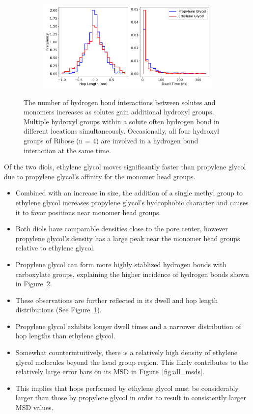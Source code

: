 \documentclass{article}
\begin{document}
\begin{figure}[!htb]
\begin{subfigure}{\textwidth}
  \includegraphics[width=0.9\linewidth]{dwell_hop_PG_GCL.pdf}
  \caption{}\label{fig:dwell_hop_PG_GCL}
  \end{subfigure}
  \caption{The number of hydrogen bond interactions between solutes and monomers increases
  as solutes gain additional hydroxyl groups. Multiple hydroxyl groups within a solute often
  hydrogen bond in different locations simultaneously. Occasionally, all four hydroxyl groups
  of Ribose (n = 4) are involved in a hydrogen bond interaction at the same time.}\label{fig:multi_hbonds}
  \end{figure}
  
  Of the two diols, ethylene glycol moves significantly faster than propylene glycol
  due to propylene glycol's affinity for the monomer head groups.  
  \begin{itemize}
    \item Combined with an increase in size, the addition of a single methyl group to ethylene glycol
    increases propylene glycol's hydrophobic character and causes it to favor positions
    near monomer head groups.
    \item Both diols have comparable densities close to the pore center, however propylene glycol's
    density has a large peak near the monomer head groups relative to ethylene glycol.
    \item Propylene glycol can form more highly stablized hydrogen bonds with carboxylate groups,
    explaining the higher incidence of hydrogen bonds shown in Figure~\ref{fig:multi_hbonds}.
    \item These observations are further reflected in its dwell and hop length distributions
    (See Figure~\ref{fig:dwell_hop_PG_GCL}).
    \item Propylene glycol exhibits longer dwell times and a narrower distribution of 
    hop lengths than ethylene glycol. 
    \item Somewhat counterintuitively, there is a relatively high density of ethylene
    glycol molecules beyond the head group region. This likely contributes to the relatively
    large error bars on its MSD in Figure~\ref{fig:all_msds}. 
    \item This implies that hops performed by ethylene glycol must be considerably larger
    than those by propylene glycol in order to result in consistently larger MSD values.
  \end{itemize}
  
\end{document}
